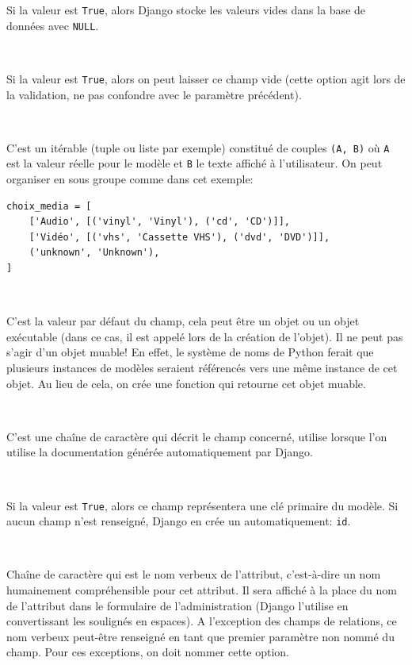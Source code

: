 \documentclass[a4paper, 10pt]{article}
\newcommand{\code}[1]{{\small\texttt{#1}}}
\begin{document}
{\begin{description}
    Si la valeur est \code{True}, alors Django stocke les valeurs vides dans la base de données avec \code{NULL}.

    \item[\texttt{blank=False}]~

    Si la valeur est \code{True}, alors on peut laisser ce champ vide (cette option agit lors de la validation, ne pas confondre avec le paramètre précédent).

    \item[\texttt{choices}]~

    C'est un itérable (tuple ou liste par exemple) constitué de couples \code{(A, B)} où \code{A} est la valeur réelle pour le modèle et \code{B} le texte affiché à l'utilisateur. On peut organiser en sous groupe comme dans cet exemple:

    \begin{verbatim}
choix_media = [
    ['Audio', [('vinyl', 'Vinyl'), ('cd', 'CD')]],
    ['Vidéo', [('vhs', 'Cassette VHS'), ('dvd', 'DVD')]],
    ('unknown', 'Unknown'),
]
    \end{verbatim}

    \item[\texttt{default}]~

    C'est la valeur par défaut du champ, cela peut être un objet ou un objet exécutable (dans ce cas, il est appelé lors de la création de l'objet). Il ne peut pas s'agir d'un objet muable! En effet, le système de noms de Python ferait que plusieurs instances de modèles seraient référencés vers une même instance de cet objet. Au lieu de cela, on crée une fonction qui retourne cet objet muable.

    \item[\texttt{help_text}]~

    C'est une chaîne de caractère qui décrit le champ concerné, utilise lorsque l'on utilise la documentation générée automatiquement par Django.

    \item[\texttt{primary_key}]~

    Si la valeur est \code{True}, alors ce champ représentera une clé primaire du modèle. Si aucun champ n'est renseigné, Django en crée un automatiquement: \code{id}.

    \item[\texttt{verboose_name}]~

    Chaîne de caractère qui est le \og nom verbeux \fg{} de l'attribut, c'est-à-dire un nom humainement compréhensible pour cet attribut. Il sera affiché à la place du nom de l'attribut dans le formulaire de l'administration (Django l'utilise en convertissant les soulignés en espaces). A l'exception des champs de relations, ce nom verbeux peut-être renseigné en tant que premier paramètre non nommé du champ. Pour ces exceptions, on doit nommer cette option.
\end{description}

}
\end{document}
